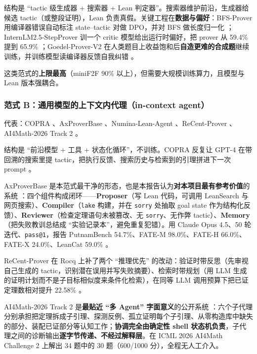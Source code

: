 \documentclass[UTF8,a4paper,11pt,fontset=windows]{ctexart}
\newcommand{\code}[1]{\texttt{#1}}
\begin{document}
结构是 ``tactic 级生成器 + 搜索器 + Lean 判定器''。搜索器维护前沿，生成器给候选 tactic（或整段证明），Lean 负责真假。关键工程在\textbf{数据与偏好}：BFS-Prover 用编译器错误自动标注 state--tactic 对做 DPO，并对 BFS 做长度归一化 \cite{bfsprover}；InternLM2.5-StepProver 训一个 critic 模型给出运行时偏好，把 prover 从 59.4\% 提到 65.9\% \cite{internlm}；Goedel-Prover-V2 在人类题目上收益饱和后\textbf{自造更难的合成题}继续训练，并训练模型读编译器反馈自我纠错 \cite{goedelv2}。

这类范式的\textbf{上限最高}（miniF2F 90\% 以上），但需要大规模训练算力，且模型与 Lean 版本强耦合。

\subsubsection{范式 B：通用模型的上下文内代理（in-context agent）}

代表：COPRA \cite{copra}、AxProverBase \cite{axprover}、Numina-Lean-Agent \cite{numina}、ReCent-Prover \cite{recent}、AI4Math-2026 Track 2 \cite{ai4math}。

结构是 ``前沿模型 + 工具 + 状态化循环''，不训练。COPRA 反复让 GPT-4 在带回溯的搜索里提 tactic，把执行反馈、搜索历史与检索到的引理拼进下一次 prompt \cite{copra}。

AxProverBase 是本范式最干净的形态，也是本报告认为\textbf{对本项目最有参考价值}的系统 \cite{axprover}：四个组件构成闭环——\textbf{Proposer}（写 Lean 代码，可调用 LeanSearch 与网页搜索）、\textbf{Compiler}（\code{lake} 构建，并在 \code{sorry} 处抽取 goal state 作为结构化反馈）、\textbf{Reviewer}（检查定理语句未被篡改、无 \code{sorry}、无作弊 tactic）、\textbf{Memory}（把失败教训总结成 ``实验记录本''，避免重复犯错）。用 Claude Opus 4.5、50 轮迭代、\code{pass@1}，报告 PutnamBench 54.7\%、FATE-M 98.0\%、FATE-H 66.0\%、FATE-X 24.0\%、LeanCat 59.0\% \cite{axprover}。

ReCent-Prover 在 Rocq 上补了两个 ``推理优先'' 的改动：验证时带反思（先审视自己生成的 tactic，识别潜在误用并写失败摘要）、检索时带规划（用 LLM 生成的证明计划而不是子目标相似度来条件化检索），在同等 LLM 调用预算下把已证定理数相对提升 22.58\% \cite{recent}。

AI4Math-2026 Track 2 是\textbf{最贴近 ``多 Agent'' 字面意义}的公开系统 \cite{ai4math}：六个子代理分别承担把定理拆成子引理、探测反例、孤立证明每个子引理、从零构造库中缺失的部分、装配已证部分等认知工作；\textbf{协调完全由确定性 shell 状态机负责}，子代理之间的诊断输出\textbf{逐字节传递、不经过解释层}。在 ICML 2026 AI4Math Challenge 2 上解出 34 题中的 30 题（600/1000 分），全程无人工介入。
\end{document}
